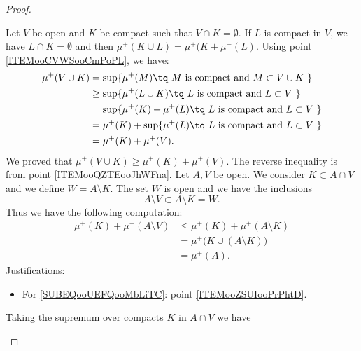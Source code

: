 \begin{proof}
\begin{subproof}
         Let \( V\) be open and \( K\) be compact such that \( V\cap K=\emptyset\). If \( L\) is compact in \( V\), we have \( L\cap K=\emptyset \) and then \( \mu^+(K\cup L)=\mu^+(K+\mu^+(L)\). Using point \ref{ITEMooCVWSooCmPoPL}, we have:
         \begin{subequations}
             \begin{align}
                 \mu^+(V\cup K)&=\sup\{ \mu^+(M)\tq \text{  \( M\) is compact and \( M\subset V\cup K\) } \}\\
                 &\geq \sup\{ \mu^+(L\cup K)\tq \text{ \( L\) is compact and \( L\subset V\) } \}\\
                 &=\sup\{ \mu^+(K)+\mu^+(L)  \tq \text{ \( L\) is compact and \( L\subset V\) } \}\\
                 &= \mu^+(K)+ \sup\{\mu^+(L)  \tq \text{ \( L\) is compact and \( L\subset V\) } \}\\
                 &=\mu^+(K)+\mu^+(V).
             \end{align}
         \end{subequations}
         We proved that \( \mu^+(V\cup K)\geq \mu^+(K)+\mu^+(V)\). The reverse inequality is from point \ref{ITEMooQZTEooJhWFna}.
        Let \( A,V\) be open. We consider \( K\subset A\cap V\) and we define \( W=A\setminus K\). The set \( W\) is open and we have the inclusions
        \begin{equation}
            A\setminus V\subset A\setminus K=W.
        \end{equation}
        Thus we have the following computation:
        \begin{subequations}        \label{SUBEQSooOSJAooBgpKec}
            \begin{align}
                \mu^+(K)+\mu^+(A\setminus V)&\leq \mu^+(K)+\mu^+(A\setminus K)\\
                &=\mu^+\big( K\cup (A\setminus K) \big)     \label{SUBEQooUEFQooMbLiTC}\\
                &=\mu^+(A).
            \end{align}
        \end{subequations}
        Justifications:
        \begin{itemize}
            \item For \eqref{SUBEQooUEFQooMbLiTC}: point \ref{ITEMooZSUIooPrPhtD}.
        \end{itemize}
        Taking the supremum over compacts \( K \) in \( A\cap V\) we have

\end{subproof}
\end{proof}
